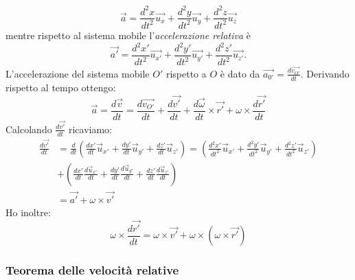 \documentclass[class=book, crop=false, oneside, 12pt]{standalone}
\begin{document}
\begin{equation}
    \overrightarrow{a} = \frac{d^2 x }{dt^2} \overrightarrow{u_x} + \frac{d^2 y }{dt^2} \overrightarrow{u_y} + \frac{d^2 z }{dt^2} \overrightarrow{u_z}
\end{equation}
mentre rispetto al sistema mobile l'\emph{accelerazione relativa} è
\begin{equation}
    \overrightarrow{a'} = \frac{d^2 x' }{dt^2} \overrightarrow{u_{x'}} + \frac{d^2 y' }{dt^2} \overrightarrow{u_{y'}} + \frac{d^2 z' }{dt^2} \overrightarrow{u_{z'}} . 
\end{equation}
L'accelerazione del sistema mobile \(O'\) rispetto a \(O\) è dato da \(\overrightarrow{a_{0'}} = \frac{d \overrightarrow{v_{O'}}}{dt}\). Derivando rispetto al tempo ottengo:
\begin{equation}
    \overrightarrow{a} = \frac{d \overrightarrow{v}}{dt} = \frac{d \overrightarrow{v_{O'}}}{dt} + \frac{d \overrightarrow{v'}}{dt} + \frac{d \overrightarrow{\omega}}{dt} \times \overrightarrow{r'} + \omega \times \frac{d \overrightarrow{r'}}{dt}
\end{equation}
Calcolando \(\frac{d \overrightarrow{v'}}{dt}\) ricaviamo:
\begin{equation}
    \begin{aligned}
        \frac{d \overrightarrow{v'}}{d t} &=\frac{d}{d t} \left(\frac{d x'}{d t} \overrightarrow{u}_{x'}+\frac{d y'}{d t} \overrightarrow{u}_{y'}+\frac{d z'}{d t} \overrightarrow{u}_{z'}\right) = \left( \frac{d^{2} x'}{d t^{2}} \overrightarrow{u}_{x'}+\frac{d^{2} y'}{d t^{2}} \overrightarrow{u}_{y'} + \frac{d^{2} z'}{d t^{2}} \overrightarrow{u}_{z'} \right)\\
        & + \left( \frac{d x'}{d t} \frac{d \overrightarrow{u}_{x'}}{d t}+\frac{d y'}{d t} \frac{d \overrightarrow{u}_{y'}}{d t}+\frac{d z'}{d t} \frac{d \overrightarrow{u}_{z'}}{d t} \right) \\
        & =\overrightarrow{a'}+\omega \times \overrightarrow{v'} 
    \end{aligned}
\end{equation}
Ho inoltre:
\begin{equation*}
    \omega \times \frac{d \overrightarrow{r'}}{dt} = \omega \times \overrightarrow{v'} + \omega \times ( \omega \times \overrightarrow{r'})
\end{equation*}

\subsubsection{Teorema delle velocità relative}
\end{document}
